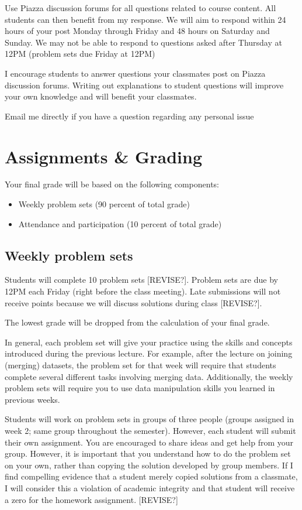 \documentclass[11pt,]{article}
\providecommand{\tightlist}{%
  \setlength{\itemsep}{0pt}\setlength{\parskip}{0pt}}
\begin{document}
Use Piazza discussion forums for all questions related to course
content. All students can then benefit from my response. We will aim to
respond within 24 hours of your post Monday through Friday and 48 hours
on Saturday and Sunday. We may not be able to respond to questions asked
after Thursday at 12PM (problem sets due Friday at 12PM)

I encourage students to answer questions your classmates post on Piazza
discussion forums. Writing out explanations to student questions will
improve your own knowledge and will benefit your classmates.

Email me directly if you have a question regarding any personal issue

\section{Assignments \& Grading}\label{assignments-grading}

Your final grade will be based on the following components:

\begin{itemize}
\tightlist
\item
  Weekly problem sets (90 percent of total grade)
\item
  Attendance and participation (10 percent of total grade)
\end{itemize}

\subsection{Weekly problem sets}\label{weekly-problem-sets}

Students will complete 10 problem sets {[}REVISE?{]}. Problem sets are
due by 12PM each Friday (right before the class meeting). Late
submissions will not receive points because we will discuss solutions
during class {[}REVISE?{]}.

The lowest grade will be dropped from the calculation of your final
grade.

In general, each problem set will give your practice using the skills
and concepts introduced during the previous lecture. For example, after
the lecture on joining (merging) datasets, the problem set for that week
will require that students complete several different tasks involving
merging data. Additionally, the weekly problem sets will require you to
use data manipulation skills you learned in previous weeks.

Students will work on problem sets in groups of three people (groups
assigned in week 2; same group throughout the semester). However, each
student will submit their own assignment. You are encouraged to share
ideas and get help from your group. However, it is important that you
understand how to do the problem set on your own, rather than copying
the solution developed by group members. If I find compelling evidence
that a student merely copied solutions from a classmate, I will consider
this a violation of academic integrity and that student will receive a
zero for the homework assignment. {[}REVISE?{]}
\end{document}
